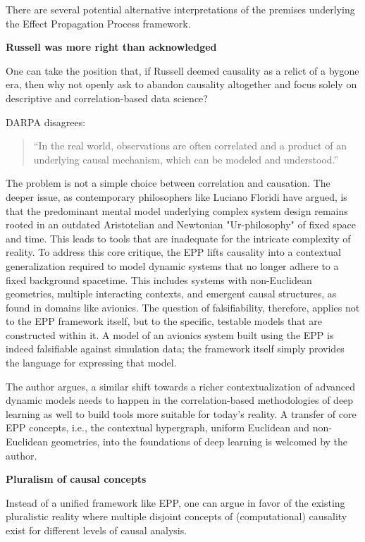 There are several potential alternative interpretations of the premises underlying the Effect Propagation Process framework.

\textbf{Russell was more right than acknowledged}

One can take the position that, if Russell deemed causality as a relict of a bygone era, then why not openly ask to abandon causality altogether and focus solely on descriptive and correlation-based data science?

DARPA disagrees\cite{DARPA_ANSR}:

\begin{quote}
    “In the real world, observations are often correlated and a product of an underlying causal mechanism, which can be modeled and understood.”
\end{quote}

The problem is not a simple choice between correlation and causation. The deeper issue, as contemporary philosophers
like Luciano Floridi have argued, is that the predominant mental model underlying complex system design remains rooted
in an outdated Aristotelian and Newtonian "Ur-philosophy" of fixed space and time. This leads to tools that are
inadequate for the intricate complexity of reality. To address this core critique, the EPP lifts causality into a
contextual generalization required to model dynamic systems that no longer adhere to a fixed background spacetime. This
includes systems with non-Euclidean geometries, multiple interacting contexts, and emergent causal structures, as found
in domains like avionics. The question of falsifiability, therefore, applies not to the EPP framework itself, but to the
specific, testable models that are constructed within it. A model of an avionics system built using the EPP is indeed
falsifiable against simulation data; the framework itself simply provides the language for expressing that model.

The author argues, a similar shift towards a richer contextualization of advanced dynamic models needs to happen in the
correlation-based methodologies of deep learning as well to build tools more suitable for today's reality. A
transfer of core EPP concepts, i.e., the contextual hypergraph, uniform Euclidean and non-Euclidean geometries, into the
foundations of deep learning is welcomed by the author.

\textbf{Pluralism of causal concepts}

Instead of a unified framework like EPP, one can argue in favor of the existing pluralistic reality where multiple disjoint concepts of (computational) causality exist for different levels of causal analysis.

